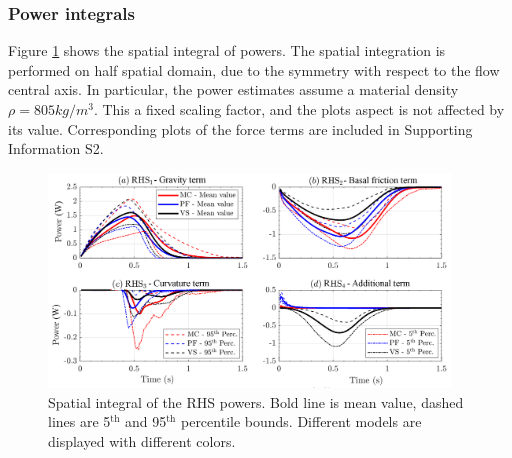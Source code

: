 \documentclass{article}
\begin{document}
\subsubsection{Power integrals}
Figure \ref{fig:Ramp-Power-spatial} shows the spatial integral of powers. The spatial integration is performed on half spatial domain, due to the symmetry with respect to the flow central axis. In particular, the power estimates assume a material density $\rho = 805 kg/m^3$. This a fixed scaling factor, and the plots aspect is not affected by its value. Corresponding plots of the force terms are included in Supporting Information S2. 
\begin{figure}[H]
        \centering
        \includegraphics[width=0.95\textwidth]{InclinedPlane/AveragedMeasurments/PowersIncline.png}
        \caption{Spatial integral of the RHS powers. Bold line is mean value, dashed lines are 5$^{\mathrm{th}}$ and 95$^{\mathrm{th}}$ percentile bounds. Different models are displayed with different colors.}
        \label{fig:Ramp-Power-spatial}
\end{figure}
\end{document}
